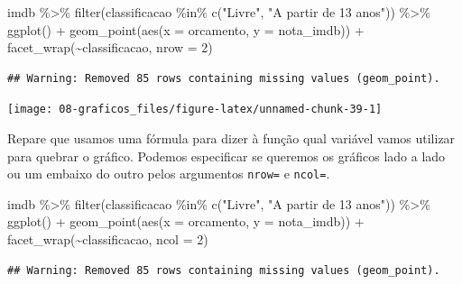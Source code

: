 \documentclass[
]{book}
\newenvironment{Shaded}{\begin{snugshade}}{\end{snugshade}}
\newcommand{\AttributeTok}[1]{\textcolor[rgb]{0.77,0.63,0.00}{#1}}
\newcommand{\DecValTok}[1]{\textcolor[rgb]{0.00,0.00,0.81}{#1}}
\newcommand{\FunctionTok}[1]{\textcolor[rgb]{0.00,0.00,0.00}{#1}}
\newcommand{\NormalTok}[1]{#1}
\newcommand{\SpecialCharTok}[1]{\textcolor[rgb]{0.00,0.00,0.00}{#1}}
\newcommand{\StringTok}[1]{\textcolor[rgb]{0.31,0.60,0.02}{#1}}
\begin{document}
\begin{Shaded}
\begin{Highlighting}[]
\NormalTok{imdb }\SpecialCharTok{\%\textgreater{}\%}
  \FunctionTok{filter}\NormalTok{(classificacao }\SpecialCharTok{\%in\%} \FunctionTok{c}\NormalTok{(}\StringTok{"Livre"}\NormalTok{, }\StringTok{"A partir de 13 anos"}\NormalTok{)) }\SpecialCharTok{\%\textgreater{}\%}
  \FunctionTok{ggplot}\NormalTok{() }\SpecialCharTok{+}
  \FunctionTok{geom\_point}\NormalTok{(}\FunctionTok{aes}\NormalTok{(}\AttributeTok{x =}\NormalTok{ orcamento, }\AttributeTok{y =}\NormalTok{ nota\_imdb)) }\SpecialCharTok{+}
  \FunctionTok{facet\_wrap}\NormalTok{(}\SpecialCharTok{\textasciitilde{}}\NormalTok{classificacao, }\AttributeTok{nrow =} \DecValTok{2}\NormalTok{)}
\end{Highlighting}
\end{Shaded}

\begin{verbatim}
## Warning: Removed 85 rows containing missing values (geom_point).
\end{verbatim}

\begin{center}\texttt{[image: 08-graficos\_files/figure-latex/unnamed-chunk-39-1]} \end{center}

Repare que usamos uma fórmula para dizer à função qual variável vamos utilizar para quebrar o gráfico. Podemos especificar se queremos os gráficos lado a lado ou um embaixo do outro pelos argumentos \texttt{nrow=} e \texttt{ncol=}.

\begin{Shaded}
\begin{Highlighting}[]
\NormalTok{imdb }\SpecialCharTok{\%\textgreater{}\%}
  \FunctionTok{filter}\NormalTok{(classificacao }\SpecialCharTok{\%in\%} \FunctionTok{c}\NormalTok{(}\StringTok{"Livre"}\NormalTok{, }\StringTok{"A partir de 13 anos"}\NormalTok{)) }\SpecialCharTok{\%\textgreater{}\%}
  \FunctionTok{ggplot}\NormalTok{() }\SpecialCharTok{+}
  \FunctionTok{geom\_point}\NormalTok{(}\FunctionTok{aes}\NormalTok{(}\AttributeTok{x =}\NormalTok{ orcamento, }\AttributeTok{y =}\NormalTok{ nota\_imdb)) }\SpecialCharTok{+}
  \FunctionTok{facet\_wrap}\NormalTok{(}\SpecialCharTok{\textasciitilde{}}\NormalTok{classificacao, }\AttributeTok{ncol =} \DecValTok{2}\NormalTok{)}
\end{Highlighting}
\end{Shaded}

\begin{verbatim}
## Warning: Removed 85 rows containing missing values (geom_point).
\end{verbatim}
\end{document}
